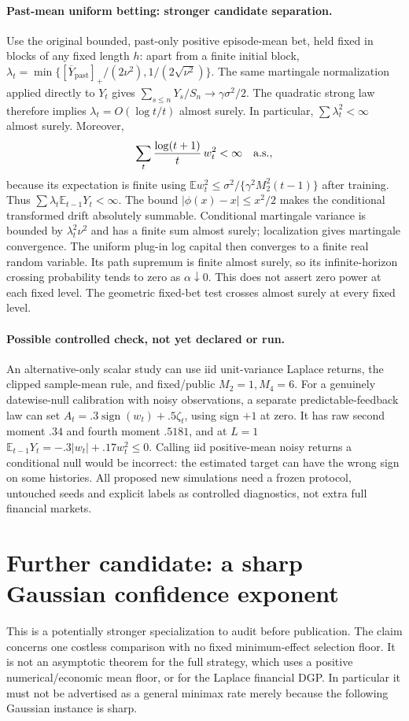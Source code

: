 \paragraph{Past-mean uniform betting: stronger candidate separation.}
Use the original bounded, past-only positive episode-mean bet, held fixed in
blocks of any fixed length $h$: apart from a finite initial block,
$\lambda_t=\min\{[\overline Y_{\mathrm{past}}]_+/(2\nu^2),
1/(2\sqrt{\nu^2})\}$. The same martingale normalization applied directly to
$Y_t$ gives
$\sum_{s\le n}Y_s/S_n\to\gamma\sigma^2/2$. The quadratic strong law therefore
implies $\lambda_t=O(\log t/t)$ almost surely. In particular,
$\sum\lambda_t^2<\infty$ almost surely. Moreover,
\[
 \sum_t\frac{\log(t+1)}t\,w_t^2<\infty\quad\hbox{a.s.},
\]
because its expectation is finite using
$\mathbb Ew_t^2\le\sigma^2/\{\gamma^2M_2^2(t-1)\}$ after training.
Thus $\sum\lambda_t\mathbb E_{t-1}Y_t<\infty$.
The bound $|\phi(x)-x|\le x^2/2$ makes the conditional transformed drift
absolutely summable. Conditional martingale variance is bounded by
$\lambda_t^2\nu^2$ and has a finite sum almost surely; localization gives
martingale convergence. The uniform plug-in log capital then converges to
a finite real random variable. Its path supremum is finite almost surely,
so its infinite-horizon crossing probability tends to zero as
$\alpha\downarrow0$. This does not assert zero power at each fixed level.
The geometric fixed-bet test crosses almost surely at every fixed level.

\paragraph{Possible controlled check, not yet declared or run.}
An alternative-only scalar study can use iid unit-variance Laplace returns,
the clipped sample-mean rule, and fixed/public $M_2=1,M_4=6$.
For a genuinely datewise-null calibration with noisy observations, a separate
predictable-feedback law can set
$A_t=.3\operatorname{sign}(w_t)+.5\zeta_t$, using sign $+1$ at zero.
It has raw second moment $.34$ and fourth moment $.5181$, and at $L=1$
$\mathbb E_{t-1}Y_t=-.3|w_t|+.17w_t^2\le0$.
Calling iid positive-mean noisy returns a conditional null would be incorrect:
the estimated target can have the wrong sign on some histories. All proposed
new simulations need a frozen protocol, untouched seeds and explicit labels
as controlled diagnostics, not extra full financial markets.

\section*{Further candidate: a sharp Gaussian confidence exponent}
This is a potentially stronger specialization to audit before publication.
The claim concerns one costless comparison with no fixed minimum-effect
selection floor. It is not an asymptotic theorem for the full strategy,
which uses a positive numerical/economic mean floor, or for the Laplace
financial DGP. In particular it must not be advertised as a general minimax
rate merely because the following Gaussian instance is sharp.

